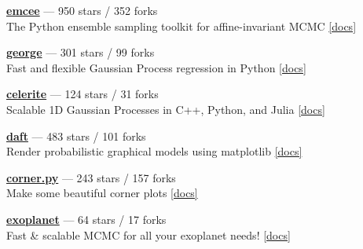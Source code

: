 \item \href{https://github.com/dfm/emcee}{{\bf emcee}} --- 950 stars / 352 forks \\
The Python ensemble sampling toolkit for affine-invariant MCMC \href{http://emcee.readthedocs.io}{[docs]}

\item \href{https://github.com/dfm/george}{{\bf george}} --- 301 stars / 99 forks \\
Fast and flexible Gaussian Process regression in Python \href{http://george.readthedocs.io}{[docs]}

\item \href{https://github.com/dfm/celerite}{{\bf celerite}} --- 124 stars / 31 forks \\
Scalable 1D Gaussian Processes in C++, Python, and Julia \href{http://celerite.rtfd.io}{[docs]}

\item \href{https://github.com/daft-dev/daft}{{\bf daft}} --- 483 stars / 101 forks \\
Render probabilistic graphical models using matplotlib \href{https://docs.daft-pgm.org}{[docs]}

\item \href{https://github.com/dfm/corner.py}{{\bf corner.py}} --- 243 stars / 157 forks \\
Make some beautiful corner plots \href{http://corner.readthedocs.io}{[docs]}

\item \href{https://github.com/dfm/exoplanet}{{\bf exoplanet}} --- 64 stars / 17 forks \\
Fast {\&} scalable MCMC for all your exoplanet needs!  \href{https://exoplanet.dfm.io}{[docs]}